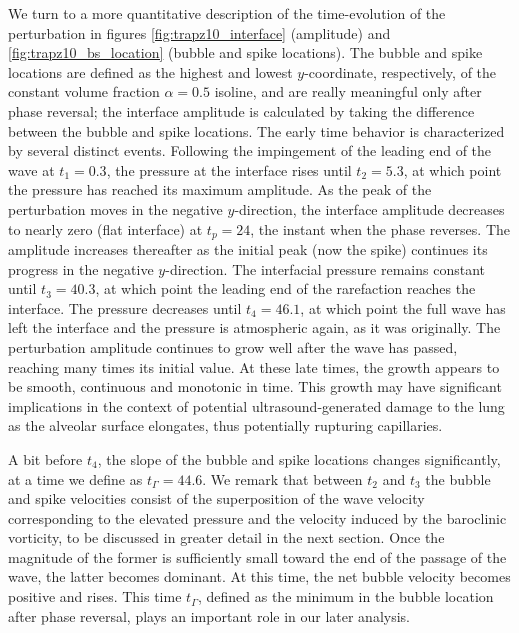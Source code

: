 We turn to a more quantitative description of the time-evolution of
the perturbation in figures \ref{fig:trapz10_interface} (amplitude)
and \ref{fig:trapz10_bs_location} (bubble and spike locations). The
bubble and spike locations are defined as the highest and lowest
$y$-coordinate, respectively, of the constant volume fraction
$\alpha = 0.5$ isoline, and are really meaningful only after phase
reversal; the interface amplitude is calculated by taking the
difference between the bubble and spike locations. The early time
behavior is characterized by several distinct events.  Following the
impingement of the leading end of the wave at $t_1=0.3$, the pressure
at the interface rises until $t_2=5.3$, at which point the pressure
has reached its maximum amplitude.  As the peak of the perturbation
moves in the negative $y$-direction, the interface amplitude decreases
to nearly zero (flat interface) at $t_p=24$, the instant when the
phase reverses.  The amplitude increases thereafter as the initial
peak (now the spike) continues its progress in the negative $y$-direction.
The interfacial pressure remains constant until $t_3=40.3$, at which
point the leading end of the rarefaction reaches the interface. The
pressure decreases until $t_4=46.1$, at which point the full wave has
left the interface and the pressure is atmospheric again, as it was
originally.  The perturbation amplitude continues to grow well after
the wave has passed, reaching many times its initial value. At these
late times, the growth appears to be smooth, continuous and monotonic
in time. This growth may have significant implications in the context
of potential ultrasound-generated damage to the lung as the alveolar
surface elongates, thus potentially rupturing capillaries.

A bit before $t_4$, the slope of the bubble and spike locations
changes significantly, at a time we define as $t_\Gamma=44.6$. We
remark that between $t_2$ and $t_3$ the bubble and spike velocities
consist of the superposition of the wave velocity corresponding to the
elevated pressure and the velocity induced by the baroclinic
vorticity, to be discussed in greater detail in the next section.
Once the magnitude of the former is sufficiently small toward the end
of the passage of the wave, the latter becomes dominant. At this time,
the net bubble velocity becomes positive and rises. This time
$t_\Gamma$, defined as the minimum in the bubble location after phase
reversal, plays an important role in our later analysis.


